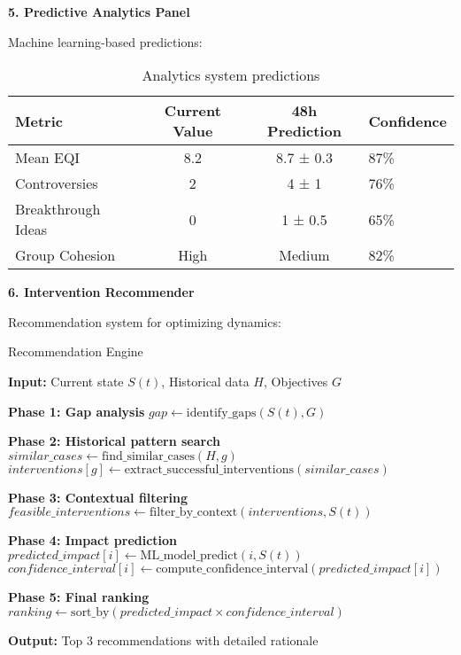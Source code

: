 \textbf{5. Predictive Analytics Panel}

Machine learning-based predictions:

\begin{table}[h]
	\centering
	\caption{Analytics system predictions}
	\label{tab:predictions}
	\begin{tabular}{lccl}
		\toprule
		\textbf{Metric} & \textbf{Current Value} & \textbf{48h Prediction} & \textbf{Confidence} \\
		\midrule
		Mean EQI & 8.2 & 8.7 ± 0.3 & 87\% \\
		Controversies & 2 & 4 ± 1 & 76\% \\
		Breakthrough Ideas & 0 & 1 ± 0.5 & 65\% \\
		Group Cohesion & High & Medium & 82\% \\
		\bottomrule
	\end{tabular}
\end{table}

\textbf{6. Intervention Recommender}

Recommendation system for optimizing dynamics:

\begin{algorithm}[H]
	\caption{Recommendation Engine}
	\label{alg:recommendations}
	\begin{algorithmic}[1]
		\State \textbf{Input:} Current state $S(t)$, Historical data $H$, Objectives $G$
		
		\State \textbf{Phase 1: Gap analysis}
		\State $gap \gets \text{identify\_gaps}(S(t), G)$
		
		\State \textbf{Phase 2: Historical pattern search}
		\State $similar\_cases \gets \text{find\_similar\_cases}(H, g)$
		\State $interventions[g] \gets \text{extract\_successful\_interventions}(similar\_cases)$
		\EndFor
		
		\State \textbf{Phase 3: Contextual filtering}
		\State $feasible\_interventions \gets \text{filter\_by\_context}(interventions, S(t))$
		
		\State \textbf{Phase 4: Impact prediction}
		\State $predicted\_impact[i] \gets \text{ML\_model\_predict}(i, S(t))$
		\State $confidence\_interval[i] \gets \text{compute\_confidence\_interval}(predicted\_impact[i])$
		\EndFor
		
		\State \textbf{Phase 5: Final ranking}
		\State $ranking \gets \text{sort\_by}(predicted\_impact \times confidence\_interval)$
		
		\State \textbf{Output:} Top 3 recommendations with detailed rationale
	\end{algorithmic}
\end{algorithm}


